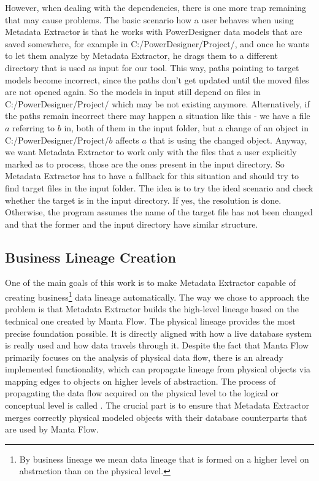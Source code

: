However, when dealing with the dependencies, there is one more trap remaining that may cause problems. The basic scenario how a user behaves when using Metadata Extractor is that he works with PowerDesigner data models that are saved somewhere, for example in C:/PowerDesigner/Project/, and once he wants to let them analyze by Metadata Extractor, he drags them to a different directory that is used as input for our tool.
This way, paths pointing to target models become incorrect, since the paths don't get updated until the moved files are not opened again. 
So the models in input still depend on files in C:/PowerDesigner/Project/ which may be not existing anymore. Alternatively, if the paths remain incorrect there may happen a situation like this - we have a file $a$ referring to $b$ in, both of them in the input folder, but a change of an object in C:/PowerDesigner/Project/$b$ affects $a$ that is using the changed object.
Anyway, we want Metadata Extractor to work only with the files that a user explicitly marked as to process, those are the ones present in the input directory.
So Metadata Extractor has to have a fallback for this situation and should try to find target files in the input folder.
The idea is to try the ideal scenario and check whether the target is in the input directory. If yes, the resolution is done.
Otherwise, the program assumes the name of the target file has not been changed and that the former and the input directory have similar structure.

\subsection{Business Lineage Creation}

One of the main goals of this work is to make Metadata Extractor capable of creating business\footnote{By business lineage we mean data lineage that is formed on a higher level on abstraction than on the physical level.} data lineage automatically.
The way we chose to approach the problem is that Metadata Extractor builds the high-level lineage based on the technical one created by Manta Flow. 
The physical lineage provides the most precise foundation possible. 
It is directly aligned with how a live database system is really used and how data travels through it.
Despite the fact that Manta Flow primarily focuses on the analysis of physical data flow, there is an already implemented functionality, which can propagate lineage from physical objects via mapping edges to objects on higher levels of abstraction.
The process of propagating the data flow acquired on the physical level to the logical or conceptual level is called .
The crucial part is to ensure that Metadata Extractor merges correctly physical modeled objects with their database counterparts that are used by Manta Flow.


